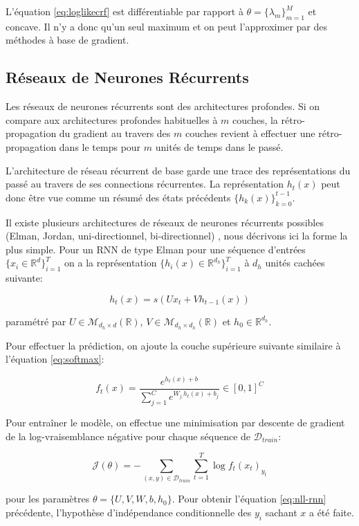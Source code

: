 L'équation \ref{eq:loglikecrf} est différentiable par rapport à $\theta=\lbrace
\lambda_m \rbrace_{m=1}^{M}$ et concave. Il n'y a donc qu'un seul maximum et on
peut l'approximer par des méthodes à base de gradient.

\subsection{Réseaux de Neurones Récurrents}

Les réseaux de neurones récurrents sont des architectures profondes. Si on
compare aux architectures profondes habituelles à $m$ couches, la rétro-propagation
du gradient au travers des $m$ couches revient à effectuer une
rétro-propagation dans le temps pour $m$ unités de temps dans le passé.

L'architecture de réseau récurrent de base \citep{rnn16} garde une trace des
représentations du passé au travers de ses connections récurrentes.  La
représentation $h_{t}(x)$ peut donc être vue comme un résumé des états
précédents $\lbrace h_{k}(x)\rbrace_{k=0}^{t-1}$.

Il existe plusieurs architectures de réseaux de neurones récurrents possibles
(Elman, Jordan, uni-directionnel, bi-directionnel) \citep{rnn15}, nous
décrivons ici la forme la plus simple. Pour un RNN de type Elman pour une séquence
d'entrées $\lbrace x_{i}\in\mathbb{R}^{d}\rbrace_{i=1}^{T}$ on a la
représentation $\lbrace h_{i}(x)\in\mathbb{R}^{d_h}\rbrace_{i=1}^{T}$ à $d_h$
unités cachées suivante:

\begin{equation}
h_t(x) = s(Ux_{t}+Vh_{t-1}(x))
\end{equation}

paramétré par $U\in\mathcal{M}_{d_h\times d}(\mathbb{R})$,
$V\in\mathcal{M}_{d_h\times d_h}(\mathbb{R})$ et $h_{0}\in\mathbb{R}^{d_h}$.

Pour effectuer la prédiction, on ajoute la couche supérieure suivante similaire à l'équation \ref{eq:softmax}:

\begin{equation}
f_{t}(x) = \frac{e^{ h_{t}(x) + b}}{\sum_{j=1}^C e^{W_{j.} h_{t}(x) + b_{j} }} \in [0,1]^{C}
\end{equation}

Pour entraîner le modèle, on effectue une minimisation par descente de gradient
de la log-vraisemblance négative pour chaque séquence de $\mathcal{D}_{train}$:

\begin{equation}
\label{eq:nll-rnn}
\mathcal{J}(\theta) = - \sum_{(x,y)\in\mathcal{D}_{train}} \sum_{t=1}^{T}\log f_{t}(x_{t})_{y_{t}}
\end{equation}

pour les paramètres $\theta=\lbrace U, V, W, b, h_{0}\rbrace$. Pour obtenir
l'équation \ref{eq:nll-rnn} précédente, l'hypothèse d'indépendance
conditionnelle des $y_i$ sachant $x$ a été faite.
